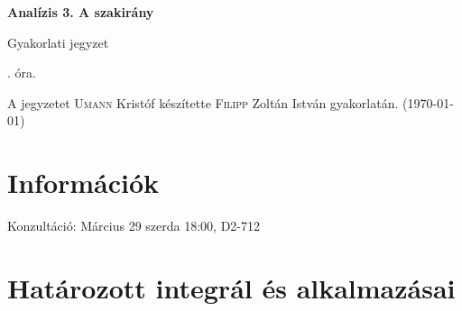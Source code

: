 \documentclass[a4paper,11.5pt]{article}
\begin{document}
	\setlength\parindent{0pt}
	\def\a{\textbf{a}}
	\def\b{\textbf{b}}
	\def\N{\hskip 10 true mm}
	\def\a{\textbf{a}}
	\def\b{\textbf{b}}
	\def\c{\textbf{c}}
	\def\d{\textbf{d}}
	\def\e{\textbf{e}}
	\def\gg{$\gamma$}
	\def\vi{\textbf{i}}
	\def\jj{\textbf{j}}
	\def\kk{\textbf{k}}
	\def\fh{\overrightarrow}
	\def\l{\lambda}
	\def\m{\mu}
	\def\v{\textbf{v}}
	\def\0{\textbf{0}}
	\def\s{\hspace{0.2mm}\vphantom{\beta}}
	\def\Z{\mathbb{Z}}
	\def\Q{\mathbb{Q}}
	\def\R{\mathbb{R}}
	\def\C{\mathbb{C}}
	\def\N{\mathbb{N}}
	\def\Rn{\mathbb{R}^{n}}
	\def\Ra{\overline{\mathbb{R}}}
	\def\sume{\displaystyle\sum_{n=1}^{+\infty}}
	\def\sumn{\displaystyle\sum_{n=0}^{+\infty}}
	\def\biz{\emph{Bizonyítás:\ }}
	\def\narrow{\underset{n\rightarrow+\infty}{\longrightarrow}}
	\def\limn{\displaystyle\lim_{n\to +\infty}}
	
	\theoremstyle{definition}
	\newtheorem{theorem}{Tétel}[subsection] %
	
	\theoremstyle{definition}
	\newtheorem{definition}[theorem]{Definíció} %
	\newtheorem{example}[theorem]{Példa} %
	\newtheorem{exercise}[theorem]{Házi feladat} %
	\newtheorem{note}[theorem]{Megjegyzés} %
	\newtheorem{task}[theorem]{Feladat} %
	\newtheorem{revision}[theorem]{Emlékeztető} %
	\begin{center}
		{\LARGE\textbf{Analízis 3. A szakirány}}
		\smallskip
		
		{\Large Gyakorlati jegyzet}
		
		. óra.
	\end{center}
	A jegyzetet \textsc{Umann} Kristóf készítette \textsc{Filipp} Zoltán István gyakorlatán. (\today)
	\section{Információk}
	Konzultáció: Március 29 szerda 18:00, D2-712
	\section{Határozott integrál és alkalmazásai}
\end{document}

